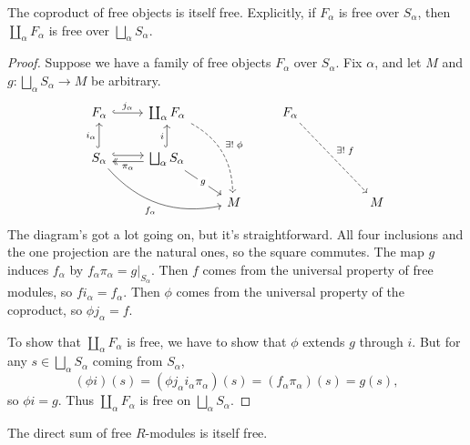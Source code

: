 \documentclass[twoside,10pt]{report}
\begin{document}
\begin{thrm}[]
	The coproduct of free objects is itself free. Explicitly, if $F_{\alpha}$ is free over $S_{\alpha}$, then $\coprod_{\alpha} F_{\alpha}$ is free over $\bigsqcup_\alpha S_{\alpha}$.
\end{thrm}
\begin{proof}
	Suppose we have a family of free objects $F_{\alpha}$ over $S_{\alpha}$. Fix $\alpha$, and let $M$ and $g:\bigsqcup_\alpha S_{\alpha}\to M$ be arbitrary.
	\[
		\begin{tikzcd}
F_\alpha \arrow[r, "j_\alpha", hook]                                                                  &  \coprod_{\alpha} F_\alpha \arrow[rdd, "\exists!\;\phi", dashed, bend left]                                                        &   & F_\alpha \arrow[rrdd, "\exists!\;f", dashed] &  &   \\
S_\alpha \arrow[rrd, "f_\alpha"', bend right] \arrow[u, "i_\alpha", hook] \arrow[r, hook, shift left] & \bigsqcup_\alpha S_\alpha \arrow[u, "i", hook] \arrow[rd, "g" description] \arrow[l, "\pi_\alpha", two heads, shift left] &   &                                              &  &   \\
                                                                                                      &                                                                                                                                   & M &                                              &  & M
\end{tikzcd}
	\] The diagram's got a lot going on, but it's straightforward. All four inclusions and the one projection are the natural ones, so the square commutes. The map $g$ induces $f_{\alpha}$ by $f_{\alpha}\pi_{\alpha}=g|_{S_{\alpha}}$. Then $f$ comes from the universal property of free modules, so $f i_{\alpha}=f_{\alpha}$. Then $\phi$ comes from the universal property of the coproduct, so $\phi j_{\alpha}=f$.

	To show that $\coprod_{\alpha} F_{\alpha}$ is free, we have to show that $\phi$ extends $g$ through $i$. But for any $s \in \bigsqcup_\alpha S_{\alpha}$ coming from $S_{\alpha}$,
	\[
		(\phi i)(s) = (\phi j_{\alpha} i_{\alpha} \pi_{\alpha})(s) = (f_{\alpha}\pi_{\alpha})(s) = g(s),
	\] 
	so $\phi i=g$. Thus $\coprod_{\alpha} F_{\alpha}$ is free on $\bigsqcup_\alpha S_{\alpha}$.
\end{proof}

\begin{cor}
	The direct sum of free $R$-modules is itself free.
\end{cor}
\end{document}
